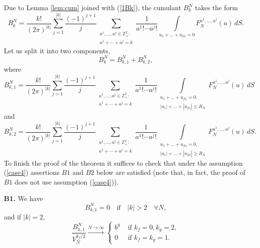 \documentclass{article}
\numberwithin{equation}{section}
\newcommand{\mZ}{\mathbb{Z}}
\newcommand{\ra}{\rightarrow}
\newcommand{\os}{\overset}
\newcommand{\fr}{\frac}
\newcommand{\qmb}{\quad\mbox}
\newcommand{\qu}{\quad}
\newcommand{\sli}{\sum\limits}
\newcommand{\ili}{\int\limits}
\newcommand{\lbl}{\label}
\newcommand{\rlem}{Lemma \nolinebreak}
\newcommand{\bee}{\begin{equation}}
\newcommand{\eee}{\end{equation}}
\newcommand{\non}{\nonumber}
\newcommand{\sck}{\substack}
\begin{document}
Due to \rlem \ref{lem:cum} joined with (\ref{1Bk}), the cumulant $B^N_k$ takes the form
\bee\lbl{jB_k^N}
B^N_k
=\fr{k!}{(2\pi)^{|k|}}
\sli_{j=1}^{|k|}\fr{(-1)^{j+1}}{j}\sli_{\sck{a^1,\ldots,a^j\in\mZ^2_+: \\ a^1+\cdots+a^j=k}}
\fr{1}{a^1!\cdots a^j!}\ili_{u_1+\ldots+ u_{|k|}=0} F_N^{a^1,\ldots,a^j}(u) \, dS.
\eee
Let us split it into two components,
$$
B^N_k= B_{k,1}^N+B_{k,2}^N,
$$
where
\bee\lbl{jsplitB}
B^N_{k,1} =
\fr{k!}{(2\pi)^{|k|}}
\sli_{j=1}^{|k|}\fr{(-1)^{j+1}}{j}
\sli_{\sck{a^1,\ldots,a^j\in\mZ^2_+: \\ a^1+\cdots+a^j=k}}
\fr{1}{a^1!\cdots a^j!}
\ili_{\sck{u_1+\ldots+ u_{|k|}=0,\\ |u_1|+\ldots+|u_{|k|}|\leq R_N}}
F_N^{a^1,\ldots,a^j}(u)\, dS
\eee
and
\bee\non
B^N_{k,2} = \fr{k!}{(2\pi)^{|k|}}
\sli_{j=1}^{|k|}\fr{(-1)^{j+1}}{j}
\sli_{\sck{a^1,\ldots,a^j\in\mZ^2_+: \\ a^1+\cdots+a^j=k}}
\fr{1}{a^1!\cdots a^j!}
\ili_{\sck{u_1+\ldots+ u_{|k|}=0,\\ |u_1|+\ldots+|u_{|k|}|\geq R_N}}
F_N^{a^1,\ldots,a^j}(u)\, dS.
\eee
To finish the proof of the theorem it suffices to
check that under the assumption (\ref{case4})
assertions $B1$ and $B2$ below are satisfied
(note that, in fact, the proof of $B1$ does not use assumption (\ref{case4})).

{\bf B1.} We have
\bee\lbl{jB1=0}
B_{k,1}^N=0 \qmb{if}\qu |k|>2 \qu \forall N,
\eee
and if $|k|=2$,
\bee\lbl{jB1}
\fr{B^N_{k,1}}{V_N^{k_f/2}}\os{N\ra\infty}\ra
\left\{
\begin{array}{cl}
b^g &\mbox{ if } k_f=0, k_g=2, \\
0 &\mbox{ if } k_f=k_g=1.
\end{array}
\right.
\eee
\end{document}
